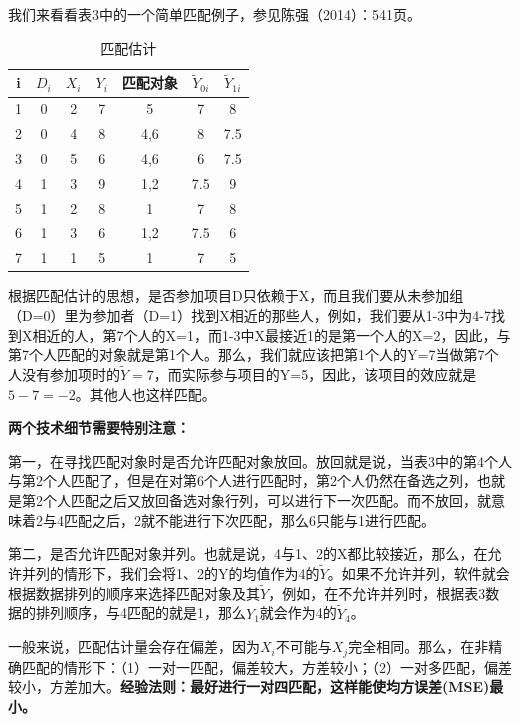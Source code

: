 \documentclass[cn,12pt,math=newtx,citestyle=gb7714-2015,bibstyle=gb7714-2015]{elegantbook}
\begin{document}
	我们来看看表3中的一个简单匹配例子，参见陈强（2014）：541页。
	
	\begin{center}
		\begin{table}[!h]
			\caption{匹配估计}\label{tab:digit}
			\begin{center}
				\begin{tabular}{c|c|c|c|c|c|c}
					\hline
					i&$D_i$&$X_i$&$Y_i$&匹配对象&$\tilde{Y}_{0i}$&$\tilde{Y}_{1i}$\\
					\hline
					1&0&2&7&{5}&7&8\\
					\hline
					2&0&4&8&{4,6}&8&7.5\\
					\hline
					3&0&5&6&{4,6}&6&7.5\\
					\hline
					4&1&3&9&{1,2}&7.5&9\\
					\hline
					5&1&2&8&{1}&7&8\\
					\hline
					6&1&3&6&{1,2}&7.5&6\\
					\hline
					7&1&1&5&{1}&7&5\\
					\hline
				\end{tabular}
			\end{center}
		\end{table}
	\end{center}
	
	根据匹配估计的思想，是否参加项目D只依赖于X，而且我们要从未参加组（D=0）里为参加者（D=1）找到X相近的那些人，例如，我们要从1-3中为4-7找到X相近的人，第7个人的X=1，而1-3中X最接近1的是第一个人的X=2，因此，与第7个人匹配的对象就是第1个人。那么，我们就应该把第1个人的Y=7当做第7个人没有参加项时的$\tilde{Y}=7$，而实际参与项目的Y=5，因此，该项目的效应就是$5-7=-2$。其他人也这样匹配。
	
	\textbf{两个技术细节需要特别注意：}
	
	第一，在寻找匹配对象时是否允许匹配对象放回。放回就是说，当表3中的第4个人与第2个人匹配了，但是在对第6个人进行匹配时，第2个人仍然在备选之列，也就是第2个人匹配之后又放回备选对象行列，可以进行下一次匹配。而不放回，就意味着2与4匹配之后，2就不能进行下次匹配，那么6只能与1进行匹配。
	
	第二，是否允许匹配对象并列。也就是说，4与1、2的X都比较接近，那么，在允许并列的情形下，我们会将1、2的Y的均值作为4的$\tilde{Y}$。如果不允许并列，软件就会根据数据排列的顺序来选择匹配对象及其$\tilde{Y}$，例如，在不允许并列时，根据表3数据的排列顺序，与4匹配的就是1，那么$Y_1$就会作为4的$\tilde{Y}_4$。
	
	一般来说，匹配估计量会存在偏差，因为$X_i$不可能与$X_j$完全相同。那么，在非精确匹配的情形下：（1）一对一匹配，偏差较大，方差较小；（2）一对多匹配，偏差较小，方差加大。\textbf{经验法则：最好进行一对四匹配，这样能使均方误差(MSE)最小。}
	
\end{document}
